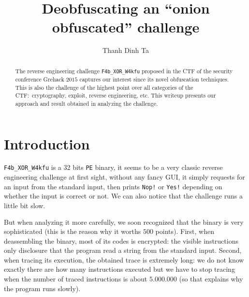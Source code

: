 \documentclass{easychair}
\begin{document}
\title{Deobfuscating an ``onion obfuscated'' challenge}

\author{
  Thanh Dinh Ta
}

\clearpage
\maketitle

\begin{abstract}
  The reverse engineering challenge \texttt{F4b\_XOR\_W4kfu} proposed in the CTF of the security conference Grehack $2015$ captures our interest since its novel obfuscation techniques. This is also the challenge of the highest point over all categories of the CTF:~cryptography, exploit, reverse engineering, etc. This writeup presents our approach and result obtained in analyzing the challenge.
\end{abstract}

\section{Introduction}
\label{sec:introduction}

\texttt{F4b\_XOR\_W4kfu} is a 32 bits \texttt{PE} binary, it seems to be a very classic reverse engineering challenge at first sight, without any fancy GUI, it simply requests for an input from the standard input, then prints \texttt{Nop!} or \texttt{Yes!} depending on whether the input is correct or not. We can also notice that the challenge runs a little bit slow.

But when analyzing it more carefully, we soon recognized that the binary is very sophisticated (this is the reason why it worths $500$ points). First, when deassembling the binary, most of its codes is encrypted: the visible instructions only disclosure that the program read a string from the standard input. Second, when tracing its execution, the obtained trace is extremely long: we do not know exactly there are how many instructions executed but we have to stop tracing when the number of traced instructions is about $5.000.000$ (so that explains why the program runs slowly).
\end{document}
